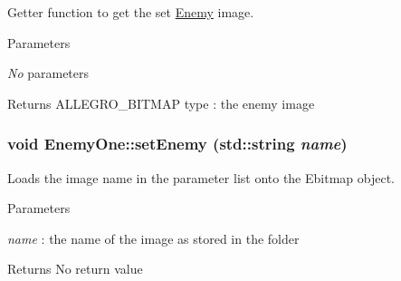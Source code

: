 Getter function to get the set \hyperlink{classEnemy}{Enemy} image. 
\begin{DoxyParams}{Parameters}
\item[{\em No}]parameters \end{DoxyParams}
\begin{DoxyReturn}{Returns}
ALLEGRO\_\-BITMAP type : the enemy image 
\end{DoxyReturn}
\hypertarget{classEnemyOne_a53c380bf26465df0f0f7beaca93b952d}{
\subsubsection[{setEnemy}]{\setlength{\rightskip}{0pt plus 5cm}void EnemyOne::setEnemy (std::string {\em name})}}
\label{classEnemyOne_a53c380bf26465df0f0f7beaca93b952d}


Loads the image name in the parameter list onto the Ebitmap object. 
\begin{DoxyParams}{Parameters}
\item[{\em name}]: the name of the image as stored in the folder \end{DoxyParams}
\begin{DoxyReturn}{Returns}
No return value 
\end{DoxyReturn}


